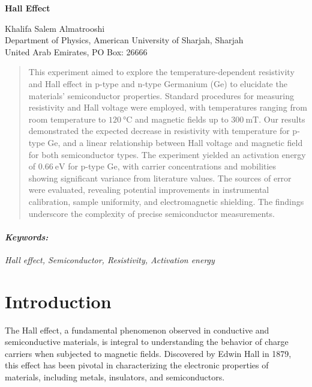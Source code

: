 \documentclass[11pt]{article}
\begin{document}
	
	\begin{titlepage}
		\begin{center}
			\begin{Large}
				\textbf{Hall Effect} \\
			\end{Large}
			\vspace{0.5cm}
			Khalifa Salem Almatrooshi \\
			\vspace{0.5cm}
			Department of Physics, American University of Sharjah, Sharjah \\
			United Arab Emirates, PO Box: 26666
		\end{center}
		\begin{abstract}
			\noindent
			This experiment aimed to explore the temperature-dependent resistivity and Hall effect in p-type and n-type Germanium (Ge) to elucidate the materials' semiconductor properties. Standard procedures for measuring resistivity and Hall voltage were employed, with temperatures ranging from room temperature to $\qty{120}{\degreeCelsius}$ and magnetic fields up to $\qty{300}{\milli\tesla}$. Our results demonstrated the expected decrease in resistivity with temperature for p-type Ge, and a linear relationship between Hall voltage and magnetic field for both semiconductor types. The experiment yielded an activation energy of $\qty{0.66}{\electronvolt}$ for p-type Ge, with carrier concentrations and mobilities showing significant variance from literature values. The sources of error were  evaluated, revealing potential improvements in instrumental calibration, sample uniformity, and electromagnetic shielding. The findings underscore the complexity of precise semiconductor measurements.
		\end{abstract}
		\paragraph{\textit{Keywords:}} \textit{Hall effect, Semiconductor, Resistivity, Activation energy}
	\end{titlepage}
	
	\clearpage
	
	\section{Introduction}	
	
	The Hall effect, a fundamental phenomenon observed in conductive and semiconductive materials, is integral to understanding the behavior of charge carriers when subjected to magnetic fields. Discovered by Edwin Hall in 1879, this effect has been pivotal in characterizing the electronic properties of materials, including metals, insulators, and semiconductors.
	
\end{document}
